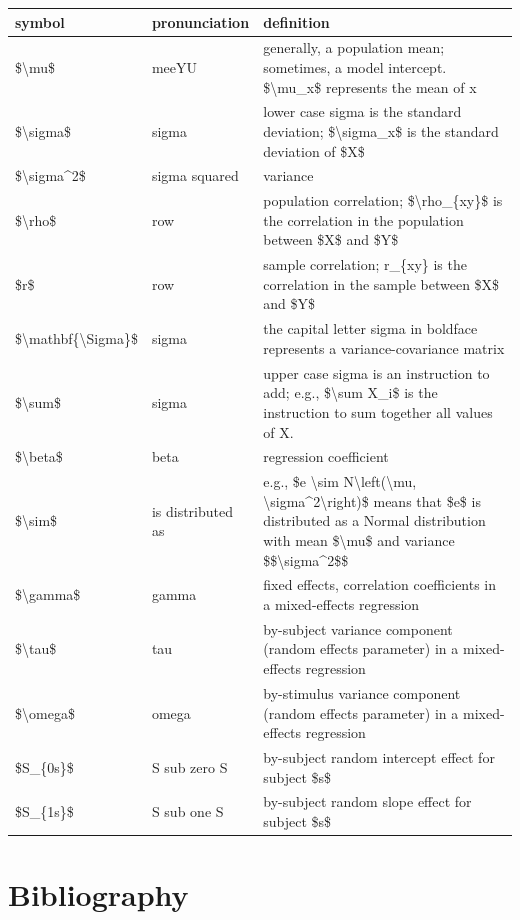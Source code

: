 \documentclass[]{book}
\begin{document}
\begin{tabular}{l|l|l}
\hline
symbol & pronunciation & definition\\
\hline
\$\textbackslash{}mu\$ & meeYU & generally, a population mean; sometimes, a model intercept. \$\textbackslash{}mu\_x\$ represents the mean of x\\
\hline
\$\textbackslash{}sigma\$ & sigma & lower case sigma is the standard deviation; \$\textbackslash{}sigma\_x\$ is the standard deviation of \$X\$\\
\hline
\$\textbackslash{}sigma\textasciicircum{}2\$ & sigma squared & variance\\
\hline
\$\textbackslash{}rho\$ & row & population correlation; \$\textbackslash{}rho\_\{xy\}\$ is the correlation in the population between \$X\$ and \$Y\$\\
\hline
\$r\$ & row & sample correlation; r\_\{xy\} is the correlation in the sample between \$X\$ and \$Y\$\\
\hline
\$\textbackslash{}mathbf\{\textbackslash{}Sigma\}\$ & sigma & the capital letter sigma in boldface represents a variance-covariance matrix\\
\hline
\$\textbackslash{}sum\$ & sigma & upper case sigma is an instruction to add; e.g., \$\textbackslash{}sum X\_i\$ is the instruction to sum together all values of X.\\
\hline
\$\textbackslash{}beta\$ & beta & regression coefficient\\
\hline
\$\textbackslash{}sim\$ & is distributed as & e.g., \$e \textbackslash{}sim N\textbackslash{}left(\textbackslash{}mu, \textbackslash{}sigma\textasciicircum{}2\textbackslash{}right)\$ means that \$e\$ is distributed as a Normal distribution with mean \$\textbackslash{}mu\$ and variance \$\$\textbackslash{}sigma\textasciicircum{}2\$\$\\
\hline
\$\textbackslash{}gamma\$ & gamma & fixed effects, correlation coefficients in a mixed-effects regression\\
\hline
\$\textbackslash{}tau\$ & tau & by-subject variance component (random effects parameter) in a mixed-effects regression\\
\hline
\$\textbackslash{}omega\$ & omega & by-stimulus variance component (random effects parameter) in a mixed-effects regression\\
\hline
\$S\_\{0s\}\$ & S sub zero S & by-subject random intercept effect for subject \$s\$\\
\hline
\$S\_\{1s\}\$ & S sub one S & by-subject random slope effect for subject \$s\$\\
\hline
\end{tabular}

\hypertarget{bibliography}{%
\chapter{Bibliography}\label{bibliography}}


\end{document}
